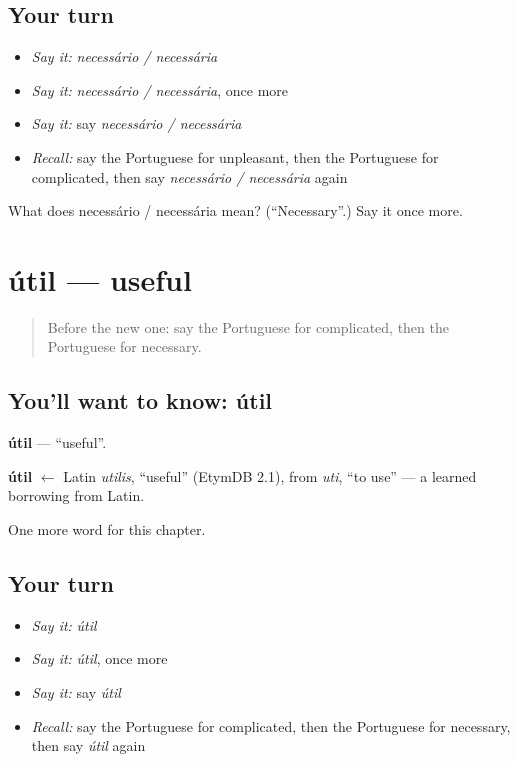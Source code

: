 \subsection*{Your turn}
\begin{itemize}
\raggedright
  \item \emph{Say it:} \emph{necessário / necessária}
  \item \emph{Say it:} \emph{necessário / necessária}, once more
  \item \emph{Say it:} say \emph{necessário / necessária}
  \item \emph{Recall:} say the Portuguese for unpleasant, then the Portuguese for complicated, then say \emph{necessário / necessária} again
\end{itemize}

\begin{tcolorbox}[breakable,colback=teal!4,colframe=teal!35!black,title={Before you move on}]
What does necessário / necessária mean? (\textquotedblleft{}Necessary\textquotedblright{}.) Say it once more.
\end{tcolorbox}
\section[útil]{útil — useful}

\label{lesson:PT-C154-util}



\begin{quote}
Before the new one: say the Portuguese for complicated, then the Portuguese for necessary.
\end{quote}

\subsection*{You'll want to know: útil}
\textbf{útil} — \textquotedblleft{}useful\textquotedblright{}.

\begin{cousinweb}
\textbf{útil} $\leftarrow$ Latin \emph{utilis}, \textquotedblleft{}useful\textquotedblright{} (EtymDB 2.1), from \emph{uti}, \textquotedblleft{}to use\textquotedblright{} — a learned borrowing from Latin.
\end{cousinweb}

\begin{grammarlens}[title={What you've built}]
One more word for this chapter.
\end{grammarlens}

\subsection*{Your turn}
\begin{itemize}
\raggedright
  \item \emph{Say it:} \emph{útil}
  \item \emph{Say it:} \emph{útil}, once more
  \item \emph{Say it:} say \emph{útil}
  \item \emph{Recall:} say the Portuguese for complicated, then the Portuguese for necessary, then say \emph{útil} again
\end{itemize}

